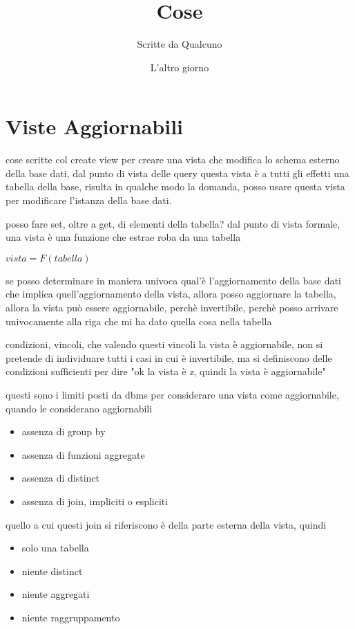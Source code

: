 \documentclass[11pt]{article}
\author{Scritte da Qualcuno}
\date{L'altro giorno}
\title{Cose}
\begin{document}
\maketitle
\tableofcontents


\section{Viste Aggiornabili}
\label{sec:org43cf4d2}
cose scritte col create view per creare una vista che modifica lo schema esterno della
base dati, dal punto di vista delle query questa vista è a tutti gli effetti una tabella
della base, risulta in qualche modo la domanda, posso usare questa vista per modificare
l'istanza della base dati.

posso fare set, oltre a get, di elementi della tabella?
dal punto di vista formale, una vista è una funzione che estrae roba da una tabella

\(vista = F(tabella)\)

se posso determinare in maniera univoca qual'è l'aggiornamento della base dati che implica
quell'aggiornamento della vista, allora posso aggiornare la tabella, allora la vista può
essere aggiornabile, perchè invertibile, perchè posso arrivare univocamente alla riga che
mi ha dato quella cosa nella tabella

condizioni, vincoli, che valendo questi vincoli la vista è aggiornabile, non si pretende
di individuare tutti i casi in cui è invertibile, ma si definiscono delle condizioni
sufficienti per dire "ok la vista è \emph{x}, quindi la vista è aggiornabile"

questi sono i limiti posti da dbms per considerare una vista come aggiornabile, quando le
considerano aggiornabili
\begin{itemize}
\item assenza di group by
\item assenza di funzioni aggregate
\item assenza di distinct
\item assenza di join, impliciti o espliciti
\end{itemize}

quello a cui questi join si riferiscono è della parte esterna della vista, quindi
\begin{itemize}
\item solo una tabella
\item niente distinct
\item niente aggregati
\item niente raggruppamento
\end{itemize}
\end{document}
